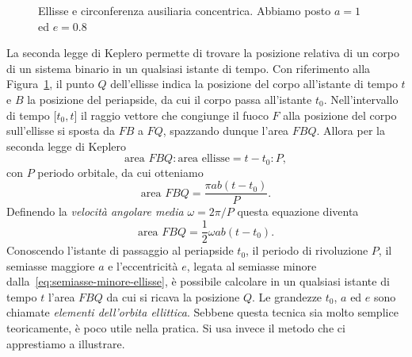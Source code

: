 \begin{figure}
  \centering
  \begin{tikzpicture}[font=\footnotesize,scale=3]
    
  \end{tikzpicture}
  \caption[Ellisse e circonferenza ausiliaria per l'equazione di
  Keplero]{Ellisse e circonferenza ausiliaria concentrica. Abbiamo posto $a=1$
    ed $e=0.8$}
  \label{fig:circonferenza-ausiliaria-keplero}
\end{figure}
La seconda legge di Keplero permette di trovare la posizione relativa di un
corpo di un sistema binario in un qualsiasi istante di tempo. Con riferimento
alla Figura~\ref{fig:circonferenza-ausiliaria-keplero}, il punto $Q$
dell'ellisse indica la posizione del corpo all'istante di tempo $t$ e $B$ la
posizione del periapside, da cui il corpo passa all'istante
$t_0$. Nell'intervallo di tempo $\mathopen{[}t_0, t\mathclose{]}$ il raggio
vettore che congiunge il fuoco $F$ alla posizione del corpo sull'ellisse si
sposta da $FB$ a $FQ$, spazzando dunque l'area $FBQ$. Allora per la seconda
legge di Keplero
\begin{equation}
  \text{area } FBQ : \text{area ellisse} = t-t_0 : P,
\end{equation}
con $P$ periodo orbitale, da cui otteniamo
\begin{equation}
  \text{area } FBQ = \frac{\pi ab(t-t_0)}{P}.
\end{equation}
Definendo la \emph{velocità angolare media} $\omega = 2\pi/P$ questa equazione
diventa
\begin{equation}
  \text{area } FBQ = \frac{1}{2}\omega ab(t-t_0).
\end{equation}
Conoscendo l'istante di passaggio al periapside $t_0$, il periodo di rivoluzione
$P$, il semiasse maggiore $a$ e l'eccentricità $e$, legata al semiasse minore
dalla~\eqref{eq:semiasse-minore-ellisse}, è possibile calcolare in un qualsiasi
istante di tempo $t$ l'area $FBQ$ da cui si ricava la posizione $Q$. Le
grandezze $t_0$, $a$ ed $e$ sono chiamate \emph{elementi dell'orbita
  ellittica}. Sebbene questa tecnica sia molto semplice teoricamente, è poco
utile nella pratica. Si usa invece il metodo che ci apprestiamo a illustrare.

